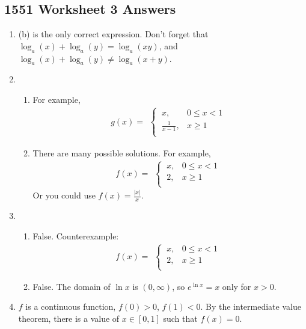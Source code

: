 \newpage\subsection*{1551 Worksheet 3 Answers}

\SolutionsStatement

\begin{enumerate}
	
    \item (b) is the only correct expression. Don't forget that $\log_a(x) + \log_a(y) = \log_a(xy)$, and $\log_a(x) + \log_a(y) \ne \log_a(x + y)$.
    
    \item \begin{enumerate} 
    \item For example,     $$g(x) = \begin{array}{cc}
    \begin{cases}
      \ x , & 0 \le x < 1 \\
      \ \frac{1}{x - 1} , & x \ge 1 \\
    \end{cases}
    \end{array}$$
    \item There are many possible solutions. For example, $$f(x) = \begin{array}{cc}
    \begin{cases}
      \ x , & 0 \le x < 1 \\
      \ 2 , & x \ge 1 \\
    \end{cases}
    \end{array}$$
    Or you could use $f(x) = \frac{|x|}{x}$.
    \end{enumerate}
    
    \item \begin{enumerate}
    \item False. Counterexample: $$f(x) = \begin{array}{cc}
    \begin{cases}
      \ x , & 0 \le x < 1 \\
      \ 2 , & x \ge 1 \\
    \end{cases}
    \end{array}$$
    \item False. The domain of $\ln x$ is $(0,\infty)$, so $e^{\ln x} = x$ only for $x > 0$.
    \end{enumerate}
    \item $f$ is a continuous function, $f(0) > 0$, $f(1) < 0$. By the intermediate value theorem, there is a value of $x \in [0,1]$ such that $f(x) = 0$. 
    

\end{enumerate}
